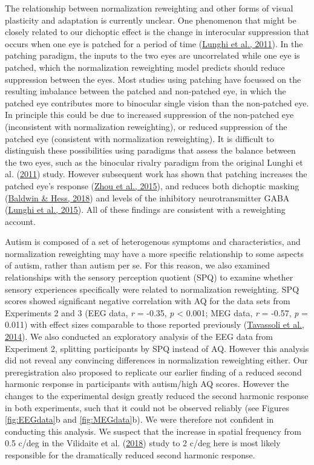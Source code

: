 \documentclass[
]{article}
\begin{document}
The relationship between normalization reweighting and other forms of visual plasticity and adaptation is currently unclear. One phenomenon that might be closely related to our dichoptic effect is the change in interocular suppression that occurs when one eye is patched for a period of time (\protect\hyperlink{ref-Lunghi2011}{Lunghi et al., 2011}). In the patching paradigm, the inputs to the two eyes are uncorrelated while one eye is patched, which the normalization reweighting model predicts should reduce suppression between the eyes. Most studies using patching have focussed on the resulting imbalance between the patched and non-patched eye, in which the patched eye contributes more to binocular single vision than the non-patched eye. In principle this could be due to increased suppression of the non-patched eye (inconsistent with normalization reweighting), or reduced suppression of the patched eye (consistent with normalization reweighting). It is difficult to distinguish these possibilities using paradigms that assess the balance between the two eyes, such as the binocular rivalry paradigm from the original Lunghi et al. (\protect\hyperlink{ref-Lunghi2011}{2011}) study. However subsequent work has shown that patching increases the patched eye's response (\protect\hyperlink{ref-Zhou2015}{Zhou et al., 2015}), and reduces both dichoptic masking (\protect\hyperlink{ref-Baldwin2018}{Baldwin \& Hess, 2018}) and levels of the inhibitory neurotransmitter GABA (\protect\hyperlink{ref-Lunghi2015}{Lunghi et al., 2015}). All of these findings are consistent with a reweighting account.

Autism is composed of a set of heterogenous symptoms and characteristics, and normalization reweighting may have a more specific relationship to some aspects of autism, rather than autism per se. For this reason, we also examined relationships with the sensory perception quotient (SPQ) to examine whether sensory experiences specifically were related to normalization reweighting. SPQ scores showed significant negative correlation with AQ for the data sets from Experiments 2 and 3 (EEG data, \emph{r} = -0.35, \emph{p} \textless{} 0.001; MEG data, \emph{r} = -0.57, \emph{p} = 0.011) with effect sizes comparable to those reported previously (\protect\hyperlink{ref-Tavassoli2014}{Tavassoli et al., 2014}). We also conducted an exploratory analysis of the EEG data from Experiment 2, splitting participants by SPQ instead of AQ. However this analysis did not reveal any convincing differences in normalization reweighting either. Our preregistration also proposed to replicate our earlier finding of a reduced second harmonic response in participants with autism/high AQ scores. However the changes to the experimental design greatly reduced the second harmonic response in both experiments, such that it could not be observed reliably (see Figures \ref{fig:EEGdata}b and \ref{fig:MEGdata}b). We were therefore not confident in conducting this analysis. We suspect that the increase in spatial frequency from 0.5 c/deg in the Vilidaite et al. (\protect\hyperlink{ref-Vilidaite2018}{2018}) study to 2 c/deg here is most likely responsible for the dramatically reduced second harmonic response.
\end{document}
